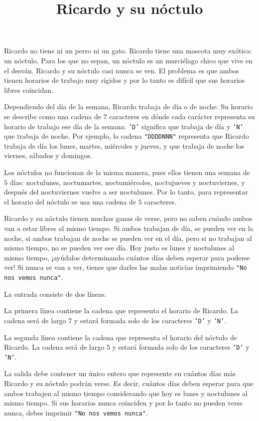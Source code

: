 \documentclass{oci}
\title{Ricardo y su nóctulo}
\begin{document}
\begin{problemDescription}
Ricardo no tiene ni un perro ni un gato.
%
Ricardo tiene una mascota muy exótica:
un nóctulo.
%
Para los que no sepan, un nóctulo es un murciélago chico que
vive en el desván.
%
Ricardo y su nóctulo casi nunca se ven.
%
El problema es que ambos tienen horarios de trabajo
muy rígidos y por lo tanto es difícil que sus
horarios libres coincidan.

Dependiendo del día de la semana, Ricardo trabaja de día o de noche.
%
Su horario se describe como una cadena de $7$ caracteres en dónde cada
carácter representa su horario de trabajo ese día de la semana:
\texttt{'D'} significa que trabaja de día y \texttt{'N'} que trabaja de noche.
%
Por ejemplo, la cadena \texttt{"DDDDNNN"} representa que
Ricardo trabaja de día los lunes, martes, miércoles y jueves,
y que trabaja de noche los viernes, sábados y domingos.

Los nóctulos no funcionan de la misma manera, pues
ellos tienen una semana de $5$ días: noctulunes,
noctumartes, noctumiércoles, noctujueves y noctuviernes,
y después del noctuviernes vuelve a ser noctulunes.
%
Por lo tanto, para representar el horario del nóctulo se usa
una cadena de $5$ caracteres.

Ricardo y su nóctulo tienen muchas ganas de verse, pero no
saben cuándo ambos van a estar libres al mismo tiempo.
%
Si ambos trabajan de día, se pueden ver en la noche, si ambos
trabajan de noche se pueden ver en el día, pero si no trabajan
al mismo tiempo, no se pueden ver ese día.
%
Hoy justo es lunes y noctulunes al mismo tiempo,
%
¡ayúdalos determinando cuántos días deben esperar para poderse ver!
%
Si nunca se van a ver, tienes que darles las malas noticias imprimiendo
\texttt{"No nos vemos nunca"}.
\end{problemDescription}

\begin{inputDescription}
La entrada consiste de dos líneas.

La primera línea contiene la cadena que representa el horario de Ricardo.
%
La cadena será de largo 7 y estará formada solo de los caracteres \texttt{'D'}
y \texttt{'N'}.

La segunda línea contiene la cadena que representa el horario del nóctulo de
Ricardo.
%
La cadena será de largo 5 y estará formada solo de los caracteres \texttt{'D'}
y \texttt{'N'}.
\end{inputDescription}

\begin{outputDescription}
La salida debe contener un único entero que represente en cuántos días más Ricardo y su nóctulo
podrán verse.
%
Es decir, cuántos días deben esperar para que ambos trabajen al mismo tiempo
considerando que hoy es lunes y noctulunes al mismo tiempo.
%
Si sus horarios nunca coinciden y por lo tanto no pueden verse nunca, debes
imprimir \texttt{"No nos vemos nunca"}.
\end{outputDescription}
\end{document}
